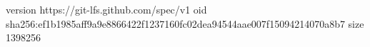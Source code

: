 version https://git-lfs.github.com/spec/v1
oid sha256:ef1b1985aff9a9e8866422f1237160fc02dea94544aae007f15094214070a8b7
size 1398256
